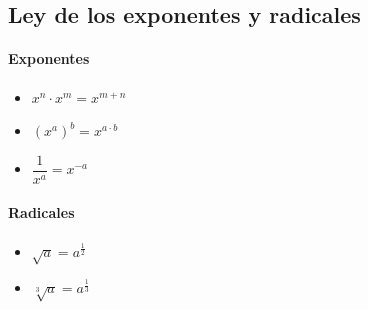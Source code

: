 \documentclass[11pt, twocolumn, landscape, a4paper]{article}
\begin{document}
\subsection*{Ley de los exponentes y radicales}

\paragraph*{Exponentes}
\begin{itemize}
\item{$x^n \cdot x^m = x^{m + n}$}
\item{$(x^a)^b = x^{a \cdot b}$}
\item{$\dfrac1{x^{a}} = x^{-a}$}
\end{itemize}

\paragraph*{Radicales}
\begin{itemize}
\item{$\sqrt{a} = a^{\frac1{2}}$}
\item{$\sqrt[3]{a} = a^{\frac1{3}}$}
\end{itemize}
\end{document}
